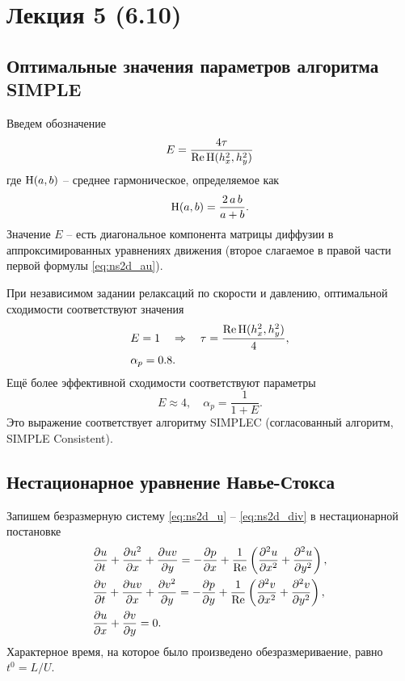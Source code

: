 \section{Лекция 5 (6.10)}

\subsection{Оптимальные значения параметров алгоритма SIMPLE}

Введем обозначение
\begin{equation*}
\label{eq:ns2d-simple-e}
E = \frac{4\tau}{\mathrm{Re}\,{\rm H}(h_x^2, h_y^2)}
\end{equation*}
где ${\rm H}(a, b)$ -- среднее гармоническое, определяемое как
$$
{\rm H}(a, b) = \frac{2\,a\,b}{a+b}.
$$
Значение $E$ -- есть диагональное компонента матрицы диффузии
в аппроксимированных уравнениях движения (второе слагаемое в правой части первой формулы \cref{eq:ns2d_au}).

При независимом задании релаксаций по скорости и давлению,
оптимальной сходимости соответствуют значения
\begin{align*}
&E = 1 \quad\Rightarrow\quad \tau = \frac{\mathrm{Re} \,{\rm H}(h_x^2, h_y^2)}{4}, \\
&\alpha_p = 0.8.
\end{align*}
Ещё более эффективной сходимости соответствуют параметры
\begin{equation}
\label{eq:ns2d-simplec}
E \approx 4, \quad \alpha_p = \frac{1}{1+E}.
\end{equation}
Это выражение соответствует алгоритму SIMPLEC (согласованный алгоритм, SIMPLE Consistent).

\subsection{Нестационарное уравнение Навье-Стокса}
\label{sec:ns2d-nonstat}

Запишем безразмерную систему \eqref{eq:ns2d_u} -- \eqref{eq:ns2d_div} в нестационарной постановке
\begin{equation}
\label{eq:ns2d_nonstat}
\begin{array}{l}
    \dfrac{\partial u}{\partial t} + \dfrac{\partial u^2}{\partial x} + \dfrac{\partial uv}{\partial y} =
        -\dfrac{\partial p}{\partial x}
        + \dfrac{1}{\mathrm{Re}}\left(\dfrac{\partial^2 u}{\partial x^2} + \dfrac{\partial^2 u}{\partial y^2}\right),\\[10pt]
    \dfrac{\partial v}{\partial t} + \dfrac{\partial uv}{\partial x} + \dfrac{\partial v^2}{\partial y} =
        -\dfrac{\partial p}{\partial y}
        + \dfrac{1}{\mathrm{Re}}\left(\dfrac{\partial^2 v}{\partial x^2} + \dfrac{\partial^2 v}{\partial y^2}\right), \\[10pt]
    \dfrac{\partial u}{\partial x} + \dfrac{\partial v}{\partial y} = 0.
\end{array}
\end{equation}
Характерное время, на которое было произведено обезразмериваение,
равно $t^0 = L/U$.

